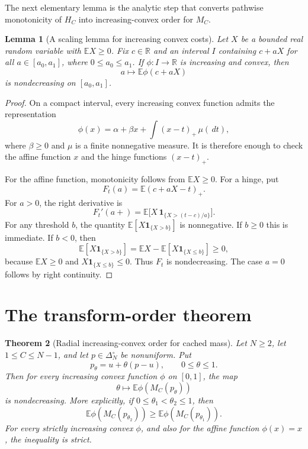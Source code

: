 \documentclass[11pt]{article}
\newtheorem{theorem}{Theorem}[section]
\newtheorem{lemma}[theorem]{Lemma}
\newcommand{\E}{\mathbb E}
\newcommand{\R}{\mathbb R}
\newcommand{\dd}{\,d}
\newcommand{\1}{\mathbf 1}
\begin{document}
The next elementary lemma is the analytic step that converts pathwise monotonicity of
$H_C$ into increasing-convex order for $M_C$.

\begin{lemma}[A scaling lemma for increasing convex costs]\label{lem:scaling}
Let $X$ be a bounded real random variable with $\E X\ge0$.  Fix $c\in\R$ and an interval
$I$ containing $c+aX$ for all $a\in[a_0,a_1]$, where $0\le a_0\le a_1$.  If
$\phi:I\to\R$ is increasing and convex, then
\[
        a\mapsto \E\phi(c+aX)
\]
is nondecreasing on $[a_0,a_1]$.
\end{lemma}

\begin{proof}
On a compact interval, every increasing convex function admits the representation
\[
        \phi(x)=\alpha+\beta x+\int (x-t)_+\,\mu(\dd t),
\]
where $\beta\ge0$ and $\mu$ is a finite nonnegative measure.  It is therefore enough to
check the affine function $x$ and the hinge functions $(x-t)_+$.

For the affine function, monotonicity follows from $\E X\ge0$.  For a hinge, put
\[
        F_t(a)=\E(c+aX-t)_+.
\]
For $a>0$, the right derivative is
\[
        F_t'(a+)=\E\bigl[X\,\1_{\{X>(t-c)/a\}}\bigr].
\]
For any threshold $b$, the quantity $\E[X\1_{\{X>b\}}]$ is nonnegative.  If $b\ge0$ this
is immediate.  If $b<0$, then
\[
        \E[X\1_{\{X>b\}}]=\E X-\E[X\1_{\{X\le b\}}]\ge0,
\]
because $\E X\ge0$ and $X\1_{\{X\le b\}}\le0$.  Thus $F_t$ is nondecreasing.  The case
$a=0$ follows by right continuity.
\end{proof}

\section{The transform-order theorem}

\begin{theorem}[Radial increasing-convex order for cached mass]\label{thm:icx}
Let $N\ge2$, let $1\le C\le N-1$, and let $p\in\Delta_N^\circ$ be nonuniform.  Put
\[
        p_\theta=u+\theta(p-u),\qquad 0\le\theta\le1.
\]
Then for every increasing convex function $\phi$ on $[0,1]$, the map
\[
        \theta\mapsto \E\phi(M_C(p_\theta))
\]
is nondecreasing.  More explicitly, if $0\le\theta_1<\theta_2\le1$, then
\begin{equation}\label{eq:icx-order}
        \E\phi(M_C(p_{\theta_2}))
        \ge
        \E\phi(M_C(p_{\theta_1})).
\end{equation}
For every strictly increasing convex $\phi$, and also for the affine function
$\phi(x)=x$, the inequality is strict.
\end{theorem}
\end{document}
